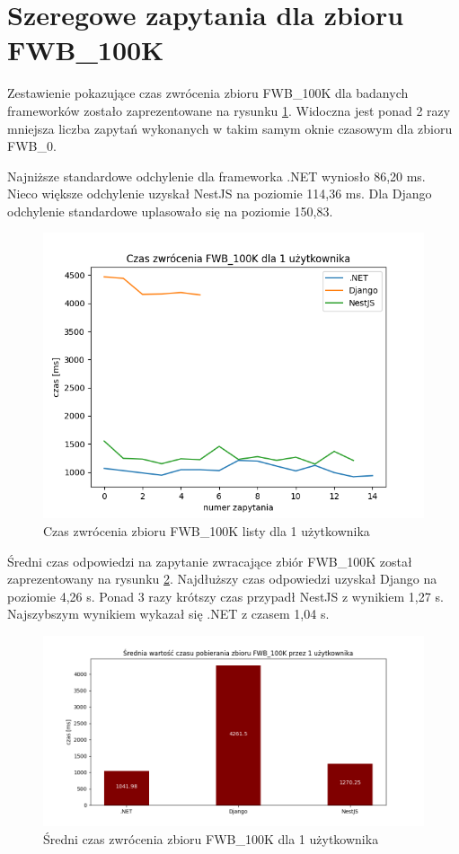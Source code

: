 \section{Szeregowe zapytania dla zbioru FWB\_100K}

Zestawienie pokazujące czas zwrócenia zbioru FWB\_100K dla badanych frameworków zostało zaprezentowane na rysunku \ref{rys:request_duration_for_FWB_100K}.
Widoczna jest ponad 2 razy mniejsza liczba zapytań wykonanych w takim samym oknie czasowym dla zbioru FWB\_0.

Najniższe standardowe odchylenie dla frameworka .NET wyniosło 86,20 ms.
Nieco większe odchylenie uzyskał NestJS na poziomie 114,36 ms.
Dla Django odchylenie standardowe uplasowało się na poziomie 150,83.

\begin{figure}[!hb]
	\centering \includegraphics[width=1\linewidth]{rysunki/Czas_zwrocenia_FWB_100K_dla_1_uzytkownika.png}
	\caption{Czas zwrócenia zbioru FWB\_100K listy dla 1 użytkownika}
	\label{rys:request_duration_for_FWB_100K}
\end{figure}

Średni czas odpowiedzi na zapytanie zwracające zbiór FWB\_100K został zaprezentowany na rysunku \ref{rys:mean_duration_for_FWB_100K}.
Najdłuższy czas odpowiedzi uzyskał Django na poziomie 4,26 s.
Ponad 3 razy krótszy czas przypadł NestJS z wynikiem 1,27 s.
Najszybszym wynikiem wykazał się .NET z czasem 1,04 s. 

\begin{figure}[!hb]
	\centering \includegraphics[width=1\linewidth]{rysunki/Srednia_wartosc_czasu_pobierania_zbioru_FWB_100K_przez_1_uzytkownika.png}
	\caption{Średni czas zwrócenia zbioru FWB\_100K dla 1 użytkownika}
	\label{rys:mean_duration_for_FWB_100K}
\end{figure}
